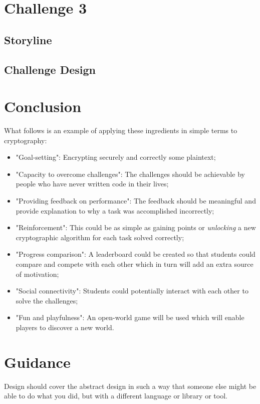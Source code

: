 \documentclass{l4proj}
\begin{document}
\section{Challenge 3}

\subsection{Storyline}

\subsection{Challenge Design}

\section{Conclusion}

What follows is an example of applying these ingredients in simple terms to cryptography:
\begin{itemize}
    \item "Goal-setting": Encrypting securely and correctly some plaintext;
    \item "Capacity to overcome challenges": The challenges should be achievable by people who have never written code in their lives;
    \item "Providing feedback on performance": The feedback should be meaningful and provide explanation to why a task was accomplished incorrectly;
    \item "Reinforcement": This could be as simple as gaining points or \textit{unlocking} a new cryptographic algorithm for each task solved correctly;
    \item "Progress comparison": A leaderboard could be created so that students could compare and compete with each other which in turn will add an extra source of motivation;
    \item "Social connectivity": Students could potentially interact with each other to solve the challenges;
    \item "Fun and playfulness": An open-world game will be used which will enable players to discover a new world.
\end{itemize}

\section{Guidance}
Design should cover the abstract design in such a way that someone else might be able to do what you did, but with a different language or library or tool.
\end{document}
